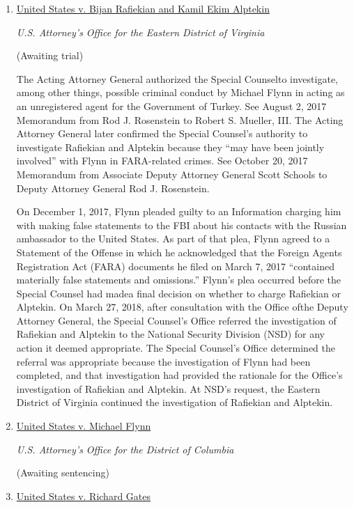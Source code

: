 \begin{enumerate}[1.]

\item \underline{United States v. Bijan Rafiekian and Kamil Ekim Alptekin}

\textit{U.S. Attorney’s Office for the Eastern District of Virginia}

(Awaiting trial)

The Acting Attorney General authorized the Special Counselto investigate, among other things, possible criminal conduct by Michael Flynn in acting as an unregistered agent for the Government of Turkey.
See August 2, 2017 Memorandum from Rod J. Rosenstein to Robert S. Mueller, III.
The Acting Attorney General later confirmed the Special Counsel’s authority to investigate Rafiekian and Alptekin because they “may have been jointly involved” with Flynn in FARA-related crimes.
See October 20, 2017 Memorandum from Associate Deputy Attorney General Scott Schools to Deputy Attorney General Rod J. Rosenstein.

On December 1, 2017, Flynn pleaded guilty to an Information charging him with making false statements to the FBI about his contacts with the Russian ambassador to the United States.
As part of that plea, Flynn agreed to a Statement of the Offense in which he acknowledged that the Foreign Agents Registration Act (FARA) documents he filed on March 7, 2017 “contained materially false statements and omissions.”
Flynn’s plea occurred before the Special Counsel had madea final decision on whether to charge Rafiekian or Alptekin.
On March 27, 2018, after consultation with the Office ofthe Deputy Attorney General, the Special Counsel’s Office referred the investigation of Rafiekian and Alptekin to the National Security Division (NSD) for any action it deemed appropriate.
The Special Counsel’s Office determined the referral was appropriate because the investigation of Flynn had been completed, and that investigation had provided the rationale for the Office’s investigation of Rafiekian and Alptekin.
At NSD’s request, the Eastern District of Virginia continued the investigation of Rafiekian and Alptekin.

    \item \underline{United States v. Michael Flynn}

\textit{U.S. Attorney’s Office for the District of Columbia}

(Awaiting sentencing)

    \item \underline{United States v. Richard Gates}


\end{enumerate}
